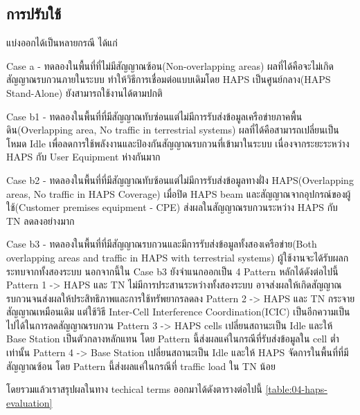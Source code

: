 \subsection{การปรับใช้}
แบ่งออกได้เป็นหลายกรณี ได้แก่

\begin{description}
    \item Case a - ทดลองในพื้นที่ที่ไม่มีสัญญาณซ้อน(Non-overlapping areas) ผลที่ได้คือจะไม่เกิดสัญญาณรบกวนภายในระบบ
            ทำให้วิธีการเชื่อมต่อแบบเดิมโดย HAPS เป็นศูนย์กลาง(HAPS Stand-Alone) ยังสามารถใช้งานได้ตามปกติ
    \item Case b1 - ทดลองในพื้นที่ที่มีสัญญาณทับซ่อนแต่ไม่มีการรับส่งข้อมูลเครือข่ายภาคพื้นดิน(Overlapping area, No traffic in terrestrial systems)
            ผลที่ได้คือสามารถเปลี่ยนเป็นโหมด Idle เพื่อลดการใช้พลังงานและป้องกันสัญญาณรบกวนที่เข้ามาในระบบ เนื่องจากระยะระหว่าง HAPS กับ User Equipment ห่างกันมาก
    \item Case b2 - ทดลองในพื้นที่ที่มีสัญญาณทับซ้อนแต่ไม่มีการรับส่งข้อมูลทางฝั่ง HAPS(Overlapping areas, No traffic in HAPS Coverage)
            เมื่อปิด HAPS beam และสัญญาณจากอุปกรณ์ของผู้ใช้(Customer premises equipment - CPE) ส่งผลในสัญญาณรบกวนระหว่าง HAPS กับ TN ลดลงอย่างมาก
    \item Case b3 - ทดลองในพื้นที่ที่มีสัญญาณรบกวนและมีการรับส่งข้อมูลทั้งสองเครือข่าย(Both overlapping areas and traffic in HAPS with terrestrial systems)
            ผู้ใช้งานจะได้รับผลกระทบจากทั้งสองระบบ นอกจากนี้ใน Case b3 ยังจำแนกออกเป็น 4 Pattern หลักได้ดังต่อไปนี้ 
            Pattern 1 -> HAPS และ TN ไม่มีการประสานระหว่างทั้งสองระบบ อาจส่งผลให้เกิดสัญญาณรบกวนจนส่งผลให้ประสิทธิภาพและการใช้ทรัพยากรลดลง
            Pattern 2 -> HAPS และ TN กระจายสัญญาณเหมือนเดิม แต่ใช้วิธี Inter-Cell Interference Coordination(ICIC) เป็นอีกความเป็นไปได้ในการลดสัญญาณรบกวน
            Pattern 3 -> HAPS cells เปลี่ยนสถานะเป็น Idle และให้ Base Station เป็นตัวกลางหลักแทน โดย Pattern นี้ส่งผลแค่ในกรณีที่รับส่งข้อมูลใน cell ต่ำเท่านั้น
            Pattern 4 -> Base Station เปลี่ยนสถานะเป็น Idle และให้ HAPS จัดการในพื้นที่ที่มีสัญญาณซ้อน โดย Pattern นี้ส่งผลแค่ในกรณีที่ traffic load ใน TN น้อย
\end{description}

โดยรวมแล้วเราสรุปผลในทาง techical terms ออกมาได้ดังตารางต่อไปนี้ \ref{table:04-haps-evaluation}

